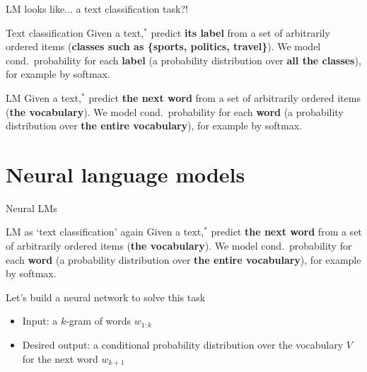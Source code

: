 \documentclass[12pt,aspectratio=169,handout]{beamer}
\begin{document}
\begin{frame}{LM looks like... a text classification task?!}

\begin{block}{Text classification}
Given a text,$^*$ predict \textbf{its label} from a set of arbitrarily ordered items (\textbf{classes such as \{sports, politics, travel\}}). We model cond.\ probability for each \textbf{label} (a probability distribution over \textbf{all the classes}), for example by softmax.
\end{block}
\pause

\begin{block}{LM}
Given a text,$^*$ predict \textbf{the next word} from a set of arbitrarily ordered items (\textbf{the vocabulary}).
We model cond.\ probability for each \textbf{word} (a probability distribution over \textbf{the entire vocabulary}), for example by softmax.
\end{block}





\end{frame}



\section{Neural language models}

\begin{frame}{Neural LMs}

\begin{block}{LM as `text classification' again}
Given a text,$^*$ predict \textbf{the next word} from a set of arbitrarily ordered items (\textbf{the vocabulary}).
We model cond.\ probability for each \textbf{word} (a probability distribution over \textbf{the entire vocabulary}), for example by softmax.
\end{block}
	
Let's build a neural network to solve this task
\pause
	\begin{itemize}
		\item Input: a $k$-gram of words $w_{1:k}$
		\item Desired output: a conditional probability distribution over the vocabulary $V$ for the next word $w_{k+1}$
	\end{itemize}
	
\end{frame}
\end{document}
